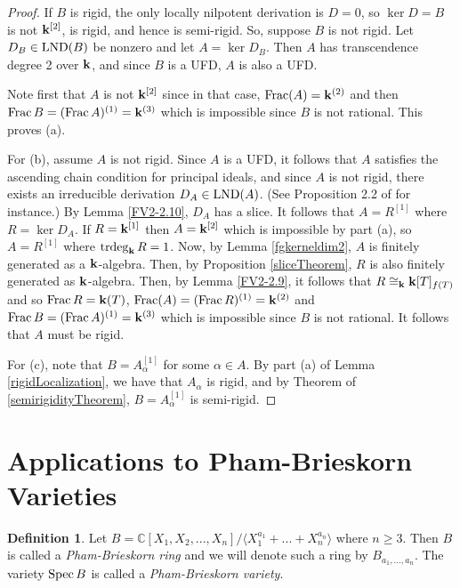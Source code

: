\documentclass[12pt]{amsart}
\theoremstyle{plain}
\theoremstyle{definition}
\newtheorem{definition}[subsection]{Definition}
\newcommand{\Spec}{		\operatorname{{\rm Spec}}}
\newcommand{\trdeg}{	\operatorname{{\rm trdeg}}}
\newcommand{\Frac}{		\operatorname{{\rm Frac}}}
\newcommand{\lb}{\langle}
\newcommand{\rb}{\rangle}
\newcommand{\Comp}{\ensuremath{\mathbb{C}}}
\newcommand{\bk}{{\ensuremath{\rm \bf k}}}
\newcommand{\lnd}{\operatorname{{\rm LND}}}
\newcommand{\isom}{\cong}
\begin{document}
\begin{proof}
	If $B$ is rigid, the only locally nilpotent derivation is $D = 0$, so $\ker D = B$ is not $\bk^{[2]}$, is rigid, and hence is semi-rigid. So, suppose $B$ is not rigid. Let $D_B \in \lnd(B)$ be nonzero and let $A = \ker D_B$. Then $A$ has transcendence degree 2 over $\bk$, and since $B$ is a UFD, $A$ is also a UFD. 
	
	Note first that $A$ is not $\bk^{[2]}$ since in that case, $\Frac(A) = \bk^{(2)}$ and then $\Frac B = (\Frac A)^{(1)} = \bk^{(3)}$ which is impossible since $B$ is not rational. This proves (a).
	
	For (b), assume $A$ is not rigid. Since $A$ is a UFD, it follows that $A$ satisfies the ascending chain condition for principal ideals, and since $A$ is not rigid, there exists an irreducible derivation $D_A \in \lnd(A)$. (See Proposition 2.2 of \cite{freudenburg2017algebraic} for instance.) By Lemma \ref{FV2-2.10}, $D_A$ has a slice. It follows that $A = R^{[1]}$ where $R = \ker D_A$. If $R = \bk^{[1]}$ then $A = \bk^{[2]}$ which is impossible by part (a), so $A = R^{[1]}$ where $\trdeg_\bk R = 1$. Now, by Lemma \ref{fgkerneldim2}, $A$ is finitely generated as a $\bk$-algebra. Then, by Proposition \ref{sliceTheorem}, $R$ is also finitely generated as $\bk$-algebra. Then, by Lemma \ref{FV2-2.9}, it follows that $R \isom_\bk \bk[T]_{f(T)}$ and so $\Frac R = \bk(T)$, $\Frac(A) = (\Frac R)^{(1)} = \bk^{(2)}$ and $\Frac B = (\Frac A)^{(1)} = \bk^{(3)}$ which is impossible since $B$ is not rational. It follows that $A$ must be rigid.
	
	For (c), note that $B = A_\alpha^{[1]}$ for some $\alpha \in A$. By part (a) of Lemma \ref{rigidLocalization}, we have that $A_\alpha$ is rigid, and by Theorem of \ref{semirigidityTheorem}, $B = A_\alpha^{[1]}$ is semi-rigid.      		
\end{proof}

\section{Applications to Pham-Brieskorn Varieties}

\begin{definition}
Let  $B = \Comp[X_1,X_2,...,X_n]/ \lb X_1^{a_1} + ... + X_n^{a_n} \rb$ where $n \geq 3$.  Then $B$ is called a \textit{Pham-Brieskorn ring} and we will denote such a ring by $B_{a_1, ..., a_n}$.  The variety $\Spec B$ is called a \textit{Pham-Brieskorn variety}.
\end{definition}
\end{document}
